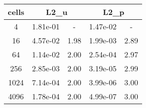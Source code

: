 \documentclass[10pt]{report}
\begin{document}
\begin{table}[H]
\begin{center}
\begin{tabular}{|c|c|c|c|c|} \hline
cells & 
\multicolumn{2}{|c|}{L2_u} & 
\multicolumn{2}{|c|}{L2_p}\\ \hline
4 & 1.81e-01 & - & 1.47e-02 & -\\ \hline
16 & 4.57e-02 & 1.98 & 1.99e-03 & 2.89\\ \hline
64 & 1.14e-02 & 2.00 & 2.54e-04 & 2.97\\ \hline
256 & 2.85e-03 & 2.00 & 3.19e-05 & 2.99\\ \hline
1024 & 7.14e-04 & 2.00 & 3.99e-06 & 3.00\\ \hline
4096 & 1.78e-04 & 2.00 & 4.99e-07 & 3.00\\ \hline
\end{tabular}
\end{center}
\end{table}
\end{document}
